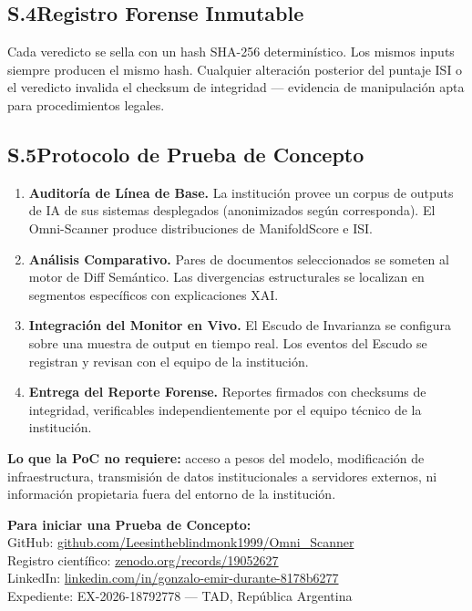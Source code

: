\documentclass[11pt, a4paper]{article}
\begin{document}
\subsection*{S.4\quad Registro Forense Inmutable}

Cada veredicto se sella con un hash SHA-256 determinístico. Los mismos inputs
siempre producen el mismo hash. Cualquier alteración posterior del puntaje ISI
o el veredicto invalida el checksum de integridad --- evidencia de manipulación
apta para procedimientos legales.

\subsection*{S.5\quad Protocolo de Prueba de Concepto}

\begin{enumerate}[leftmargin=*, label=\textbf{Fase \arabic*.}]
  \item \textbf{Auditoría de Línea de Base.} La institución provee un corpus de
    outputs de IA de sus sistemas desplegados (anonimizados según corresponda).
    El Omni-Scanner produce distribuciones de ManifoldScore e ISI.
  \item \textbf{Análisis Comparativo.} Pares de documentos seleccionados se
    someten al motor de Diff Semántico. Las divergencias estructurales se
    localizan en segmentos específicos con explicaciones XAI.
  \item \textbf{Integración del Monitor en Vivo.} El Escudo de Invarianza se
    configura sobre una muestra de output en tiempo real. Los eventos del
    Escudo se registran y revisan con el equipo de la institución.
  \item \textbf{Entrega del Reporte Forense.} Reportes firmados con checksums
    de integridad, verificables independientemente por el equipo técnico
    de la institución.
\end{enumerate}

\textbf{Lo que la PoC no requiere:} acceso a pesos del modelo, modificación
de infraestructura, transmisión de datos institucionales a servidores externos,
ni información propietaria fuera del entorno de la institución.

\begin{statbox}
\textbf{Para iniciar una Prueba de Concepto:}\\[4pt]
GitHub: \href{https://github.com/Leesintheblindmonk1999/Omni_Scanner}%
  {github.com/Leesintheblindmonk1999/Omni\_Scanner}\\
Registro científico: \href{https://zenodo.org/records/19052627}%
  {zenodo.org/records/19052627}\\
LinkedIn: \href{https://www.linkedin.com/in/gonzalo-emir-durante-8178b6277}%
  {linkedin.com/in/gonzalo-emir-durante-8178b6277}\\
Expediente: EX-2026-18792778 --- TAD, República Argentina
\end{statbox}
\end{document}
